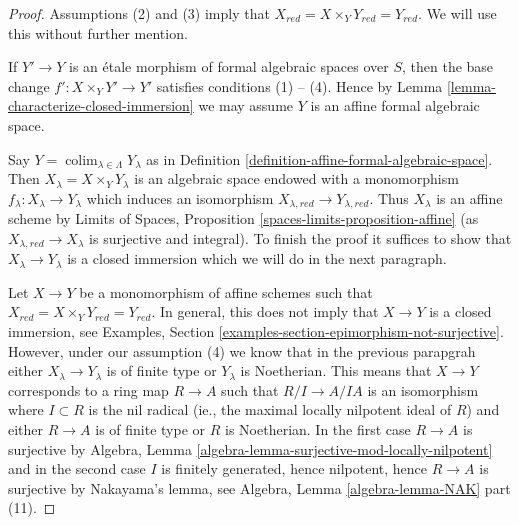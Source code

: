 \documentclass{stacks-project}
\theoremstyle{plain}
\theoremstyle{definition}
\theoremstyle{remark}
\numberwithin{equation}{subsection}
\def\colim{\mathop{\mathrm{colim}}\nolimits}
\begin{document}
\begin{proof}
Assumptions (2) and (3) imply that
$X_{red} = X \times_Y Y_{red} = Y_{red}$.
We will use this without further mention.

\medskip\noindent
If $Y' \to Y$ is an \'etale morphism of formal algebraic spaces over $S$,
then the base change $f' : X \times_Y Y' \to Y'$ satisfies conditions
(1) -- (4). Hence by Lemma \ref{lemma-characterize-closed-immersion}
we may assume $Y$ is an affine formal algebraic space.

\medskip\noindent
Say $Y = \colim_{\lambda \in \Lambda} Y_\lambda$ as in
Definition \ref{definition-affine-formal-algebraic-space}.
Then $X_\lambda = X \times_Y Y_\lambda$ is an algebraic space
endowed with a monomorphism $f_\lambda : X_\lambda \to Y_\lambda$
which induces an isomorphism $X_{\lambda, red} \to Y_{\lambda, red}$.
Thus $X_\lambda$ is an affine scheme by
Limits of Spaces, Proposition \ref{spaces-limits-proposition-affine}
(as $X_{\lambda, red} \to X_\lambda$ is surjective and integral).
To finish the proof it suffices to show that
$X_\lambda \to Y_\lambda$ is a closed immersion
which we will do in the next paragraph.

\medskip\noindent
Let $X \to Y$ be a monomorphism of affine schemes such that
$X_{red} = X \times_Y Y_{red} = Y_{red}$. In general, this does
not imply that $X \to Y$ is a closed immersion, see
Examples, Section \ref{examples-section-epimorphism-not-surjective}.
However, under our assumption (4) we know that in the previous parapgrah
either $X_\lambda \to Y_\lambda$ is of finite type or $Y_\lambda$
is Noetherian. This means that
$X \to Y$ corresponds to a ring map $R \to A$ such that
$R/I \to A/IA$ is an isomorphism where $I \subset R$ is the
nil radical (ie., the maximal locally nilpotent ideal of $R$)
and either $R \to A$ is of finite type or $R$ is Noetherian.
In the first case $R \to A$ is surjective by
Algebra, Lemma \ref{algebra-lemma-surjective-mod-locally-nilpotent}
and in the second case $I$ is finitely generated, hence
nilpotent, hence $R \to A$ is surjective by Nakayama's lemma, see
Algebra, Lemma \ref{algebra-lemma-NAK} part (11).
\end{proof}
\end{document}
